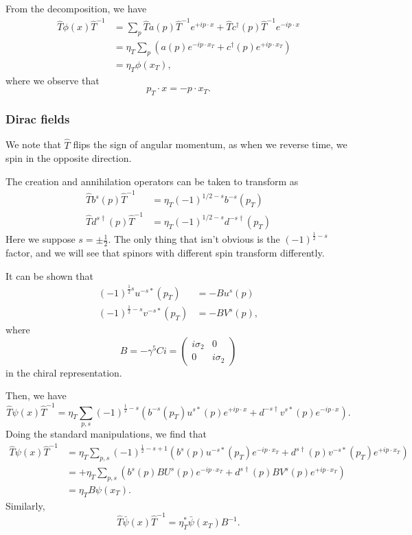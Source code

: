 \documentclass[a4paper]{article}
\begin{document}
From the decomposition, we have
\begin{align*}
  \hat{T}\phi(x) \hat{T}^{-1} &= \sum_p \hat{T} a(p) \hat{T}^{-1} e^{+ip\cdot x} + \hat{T} c^\dagger(p) \hat{T}^{-1} e^{-ip\cdot x}\\
  &= \eta_T \sum_p \left(a(p) e^{-i p\cdot x_T} + c^\dagger (p) e^{+i p\cdot x_T}\right)\\
  &= \eta_T \phi(x_T),
\end{align*}
where we observe that
\[
  p_T \cdot x = -p \cdot x_T.
\]
\subsubsection*{Dirac fields}
We note that $\hat{T}$ flips the sign of angular momentum, as when we reverse time, we spin in the opposite direction.

The creation and annihilation operators can be taken to transform as
\begin{align*}
  \hat{T} b^s(p) \hat{T}^{-1} &= \eta_T (-1)^{1/2 - s} b^{-s}(p_T)\\
  \hat{T} d^{s\dagger}(p) \hat{T}^{-1} &= \eta_T (-1)^{1/2 - s} d^{-s\dagger}(p_T)
\end{align*}
Here we suppose $s = \pm \frac{1}{2}$. The only thing that isn't obvious is the $(-1)^{\frac{1}{2} - s}$ factor, and we will see that spinors with different spin transform differently.

It can be shown that
\begin{align*}
  (-1)^{\frac{1}{2} s} u^{-s*}(p_T) &= -B u^s(p)\\
  (-1)^{\frac{1}{2} - s} v^{-s*}(p_T) &= -B V^s(p),
\end{align*}
where
\[
  B = - \gamma^5 Ci =
  \begin{pmatrix}
    i\sigma_2 & 0\\
    0 & i \sigma_2
  \end{pmatrix}
\]
in the chiral representation.

Then, we have
\[
  \hat{T} \psi(x) \hat{T}^{-1} = \eta_T \sum_{p, s} (-1)^{\frac{1}{2} - s} \left(b^{-s}(p_T) u^{s*}(p) e^{+ip\cdot x} + d^{-s\dagger} v^{s*}(p) e^{-ip\cdot x}\right).
\]
Doing the standard manipulations, we find that
\begin{align*}
  \hat{T} \psi(x) \hat{T}^{-1} &= \eta_T \sum_{p, s} (-1)^{\frac{1}{2} - s + 1} \left(b^s(p) u^{-s*}(p_T) e^{-ip\cdot x_T} + d^{s\dagger}(p) v^{-s*}(p_T) e^{+ip\cdot x_T}\right)\\
  &= +\eta_T \sum_{p, s} \left(b^s(p) BU^s(p) e^{-ip\cdot x_T} + d^{s\dagger} (p) BV^s(p) e^{+ip\cdot x_T}\right)\\
  &= \eta_T B \psi(x_T).
\end{align*}
Similarly,
\[
  \hat{T}\bar\psi(x) \hat{T}^{-1} = \eta_T^* \bar\psi(x_T) B^{-1}.
\]
\end{document}
